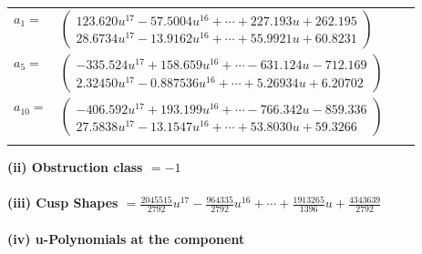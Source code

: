 \documentclass[1p]{elsarticle_modified}
\theoremstyle{definition}
\begin{document}
\begin{tabular}{m{7pt} m{180pt} m{7pt} m{180pt} }
\flushright $a_{1}=$&$\begin{pmatrix}123.620 u^{17}-57.5004 u^{16}+\cdots+227.193 u+262.195\\28.6734 u^{17}-13.9162 u^{16}+\cdots+55.9921 u+60.8231\end{pmatrix}$ \\
\flushright $a_{5}=$&$\begin{pmatrix}-335.524 u^{17}+158.659 u^{16}+\cdots-631.124 u-712.169\\2.32450 u^{17}-0.887536 u^{16}+\cdots+5.26934 u+6.20702\end{pmatrix}$ \\
\flushright $a_{10}=$&$\begin{pmatrix}-406.592 u^{17}+193.199 u^{16}+\cdots-766.342 u-859.336\\27.5838 u^{17}-13.1547 u^{16}+\cdots+53.8030 u+59.3266\end{pmatrix}$\\&\end{tabular}
\flushleft \textbf{(ii) Obstruction class $= -1$}\\~\\
\flushleft \textbf{(iii) Cusp Shapes $= \frac{2045515}{2792} u^{17}-\frac{964335}{2792} u^{16}+\cdots+\frac{1913265}{1396} u+\frac{4343639}{2792}$}\\~\\
\newpage\renewcommand{\arraystretch}{1}
\flushleft \textbf{(iv) u-Polynomials at the component}\newline \\
\end{document}
